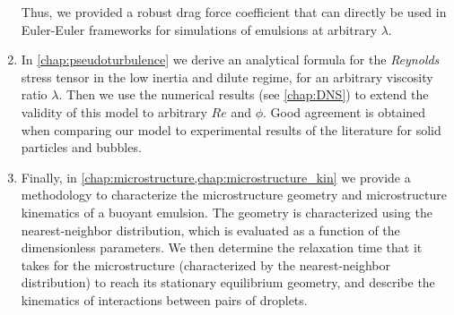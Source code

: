 \begin{enumerate}
    Thus, we provided a robust drag force coefficient that can directly be used in Euler-Euler frameworks for simulations of emulsions at arbitrary $\lambda$.   
    \item In \ref{chap:pseudoturbulence} we derive an analytical formula for the \textit{Reynolds} stress tensor in the low inertia and dilute regime, for an arbitrary viscosity ratio $\lambda$. 
    Then we use the numerical results (see \ref{chap:DNS}) to extend the validity of this model to arbitrary $Re$ and $\phi$. 
    Good agreement is obtained when comparing our model to experimental results of the literature for solid particles and bubbles.  
    \item Finally, in \ref{chap:microstructure,chap:microstructure_kin} we provide a methodology to characterize the microstructure geometry and microstructure kinematics of a buoyant emulsion. 
    The geometry is characterized using the nearest-neighbor distribution, which is evaluated as a function of the dimensionless parameters. 
    We then determine the relaxation time that it takes for the microstructure (characterized by the nearest-neighbor distribution) to reach its stationary equilibrium geometry, and describe the kinematics of interactions between pairs of droplets. 
\end{enumerate}

